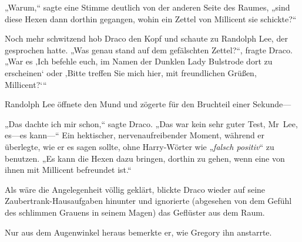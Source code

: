 „Warum,“ sagte eine Stimme deutlich von der anderen Seite des Raumes, „sind diese Hexen dann dorthin gegangen, wohin ein Zettel von Millicent sie schickte?“

Noch mehr schwitzend hob Draco den Kopf und schaute zu Randolph Lee, der gesprochen hatte. „Was genau stand auf dem gefälschten Zettel?“, fragte Draco. „War es ‚Ich befehle euch, im Namen der Dunklen Lady Bulstrode dort zu erscheinen‘ oder ‚Bitte treffen Sie mich hier, mit freundlichen Grüßen, Millicent?‘“

Randolph Lee öffnete den Mund und zögerte für den Bruchteil einer Sekunde—

„Das dachte ich mir schon,“ sagte Draco. „Das war kein sehr guter Test, Mr~Lee, es—es kann—“ Ein hektischer, nervenaufreibender Moment, während er überlegte, wie er es sagen sollte, ohne Harry-Wörter wie „\emph{falsch positiv}“ zu benutzen. „Es kann die Hexen dazu bringen, dorthin zu gehen, wenn eine von ihnen mit Millicent befreundet ist.“

Als wäre die Angelegenheit völlig geklärt, blickte Draco wieder auf seine Zaubertrank-Hausaufgaben hinunter und ignorierte (abgesehen von dem Gefühl des schlimmen Grauens in seinem Magen) das Geflüster aus dem Raum.

Nur aus dem Augenwinkel heraus bemerkte er, wie Gregory ihn anstarrte.

\later

